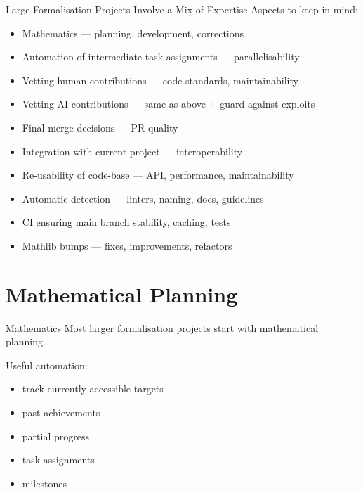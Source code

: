 \documentclass{beamer}
\begin{document}
\begin{frame}{Large Formalisation Projects Involve a Mix of Expertise}
Aspects to keep in mind:

\medskip

\begin{itemize}
  \item Mathematics — planning, development, corrections
  \smallskip
  \item Automation of intermediate task assignments — parallelisability
  \smallskip
  \item Vetting human contributions — code standards, maintainability
  \smallskip
  \item Vetting AI contributions — same as above + guard against exploits
  \smallskip
  \item Final merge decisions — PR quality
  \smallskip
  \item Integration with current project — interoperability
  \smallskip
  \item Re-usability of code-base — API, performance, maintainability
  \smallskip
  \item Automatic detection — linters, naming, docs, guidelines
  \smallskip
  \item CI ensuring main branch stability, caching, tests
  \smallskip
  \item Mathlib bumps — fixes, improvements, refactors
\end{itemize}
\end{frame}

\section{Mathematical Planning}

\begin{frame}{Mathematics}
Most larger formalisation projects start with mathematical planning.

\bigskip

Useful automation:

\medskip

\begin{itemize}
  \item track currently accessible targets
  \medskip
  \item past achievements
  \medskip
  \item partial progress
  \medskip
  \item task assignments
  \medskip
  \item milestones
\end{itemize}
\end{frame}
\end{document}
